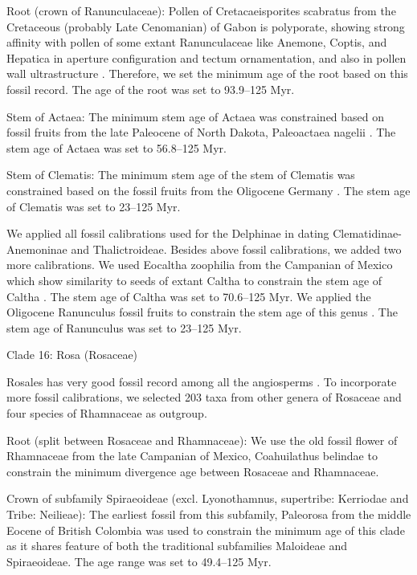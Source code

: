\documentclass[10pt]{article}
\begin{document}
Root (crown of Ranunculaceae): Pollen of Cretacaeisporites scabratus
from the Cretaceous (probably Late Cenomanian) of Gabon is polyporate,
showing strong affinity with pollen of some extant Ranunculaceae like
Anemone, Coptis, and Hepatica in aperture configuration and tectum
ornamentation, and also in pollen wall ultrastructure
\citep{Ward1994}. Therefore, we set the minimum age of the root based
on this fossil record. The age of the root was set to 93.9--125 Myr.

Stem of Actaea: The minimum stem age of Actaea was constrained based
on fossil fruits from the late Paleocene of North Dakota, Paleoactaea
nagelii \citep{Pigg2005}. The stem age of Actaea was set to 56.8--125
Myr.

Stem of Clematis: The minimum stem age of the stem of Clematis was
constrained based on the fossil fruits from the Oligocene Germany
\citep{Weyland1938}. The stem age of Clematis was set to 23--125 Myr.

We applied all fossil calibrations used for the Delphinae in dating
Clematidinae-Anemoninae and Thalictroideae. Besides above fossil
calibrations, we added two more calibrations. We used Eocaltha
zoophilia from the Campanian of Mexico which show similarity to seeds
of extant Caltha to constrain the stem age of Caltha
\citep{Rodriguez1998}. The stem age of Caltha was set to 70.6--125
Myr. We applied the Oligocene Ranunculus fossil fruits to constrain
the stem age of this genus \citep{Mai1985}. The stem age of Ranunculus
was set to 23--125 Myr.

Clade 16: Rosa (Rosaceae)

Rosales has very good fossil record among all the angiosperms
\citep{Xing2016}. To incorporate more fossil calibrations, we selected
203 taxa from other genera of Rosaceae and four species of Rhamnaceae
as outgroup.

Root (split between Rosaceae and Rhamnaceae): We use the old fossil
flower of Rhamnaceae from the late Campanian of Mexico, Coahuilathus
belindae \citep{Calvillo-Canadell2007} to constrain the minimum
divergence age between Rosaceae and Rhamnaceae.

Crown of subfamily Spiraeoideae (excl. Lyonothamnus, supertribe:
Kerriodae and Tribe: Neilieae): The earliest fossil from this
subfamily, Paleorosa from the middle Eocene of British Colombia
\citep{Basinger1976} was used to constrain the minimum age of this
clade as it shares feature of both the traditional subfamilies
Maloideae and Spiraeoideae. The age range was set to 49.4--125 Myr.
\end{document}
